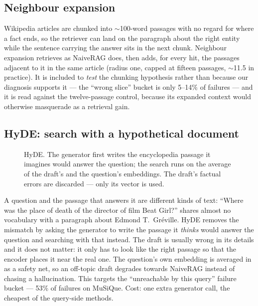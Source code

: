 \subsection{Neighbour expansion}
\label{sec:arch-neighbour}

Wikipedia articles are chunked into $\sim$100-word passages with no regard
for where a fact ends, so the retriever can land on the paragraph about the
right entity while the sentence carrying the answer sits in the next chunk.
Neighbour expansion retrieves as NaiveRAG does, then adds, for every hit,
the passages adjacent to it in the same article (radius one, capped at
fifteen passages, $\sim$11.5 in practice). It is included to \emph{test}
the chunking hypothesis rather than because our diagnosis supports it ---
the ``wrong slice'' bucket is only 5--14\% of failures --- and it is read
against the twelve-passage control, because its expanded context would
otherwise masquerade as a retrieval gain.

\subsection{HyDE: search with a hypothetical document}
\label{sec:arch-hyde}

\begin{figure}[t]
\centering
{}
\caption{HyDE. The generator first writes the encyclopedia passage it
imagines would answer the question; the search runs on the average of the
draft's and the question's embeddings. The draft's factual errors are
discarded --- only its vector is used.}
\label{fig:arch-hyde}
\end{figure}

A question and the passage that answers it are different kinds of text:
``Where was the place of death of the director of film Beat Girl?'' shares
almost no vocabulary with a paragraph about Edmond T.\ Gr\'eville. HyDE
\cite{gao2022hyde} removes the mismatch by asking the generator to write
the passage it \emph{thinks} would answer the question and searching with
that instead. The draft is usually wrong in its details and it does not
matter: it only has to look like the right passage so that the encoder
places it near the real one. The question's own embedding is averaged in
as a safety net, so an off-topic draft degrades towards NaiveRAG instead
of chasing a hallucination. This targets the ``unreachable by this query''
failure bucket --- 53\% of failures on MuSiQue. Cost: one extra generator
call, the cheapest of the query-side methods.

